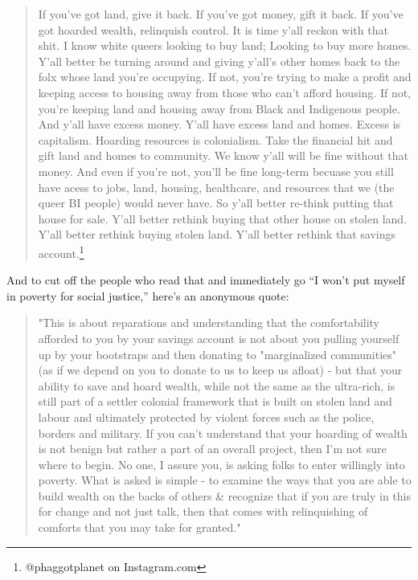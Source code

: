 \documentclass[11pt]{article}
\begin{document}
\begin{itemize}
\begin{quote}
If you've got land, give it back. If you've got money, gift it back. If you've got hoarded wealth, relinquish control. It is time y'all reckon with that shit. I know white queers looking to buy land; Looking to buy more homes. Y'all better be turning around and giving y'all's other homes back to the folx whose land you're occupying. If not, you're trying to make a profit and keeping access to housing away from those who can't afford housing. If not, you're keeping land and housing away from Black and Indigenous people. And y'all have excess money. Y'all have excess land and homes. Excess is capitalism. Hoarding resources is colonialism. Take the financial hit and gift land and homes to community. We know y'all will be fine without that money. And even if you're not, you'll be fine long-term becuase you still have acess to jobs, land, housing, healthcare, and resources that we (the queer BI people) would never have. So y'all better re-think putting that house for sale. Y'all better rethink buying that other house on stolen land. Y'all better rethink buying stolen land. Y'all better rethink that savings account.\footnote{@phaggotplanet on Instagram.com}
\end{quote}

And to cut off the people who read that and immediately go “I won’t put myself in poverty for social justice,” here’s an anonymous quote:

\begin{quote}
"This is about reparations and understanding that the comfortability afforded to you by your savings account is not about you pulling yourself up by your bootstraps and then donating to "marginalized communities" (as if we depend on you to donate to us to keep us afloat) - but that your ability to save and hoard wealth, while not the same as the ultra-rich, is still part of a settler colonial framework that is built on stolen land and labour and ultimately protected by violent forces such as the police, borders and military. If you can't understand that your hoarding of wealth is not benign but rather a part of an overall project, then I'm not sure where to begin. No one, I assure you, is asking folks to enter willingly into poverty. What is asked is simple - to examine the ways that you are able to build wealth on the backs of others \& recognize that if you are truly in this for change and not just talk, then that comes with relinquishing of comforts that you may take for granted."
\end{quote}


\end{itemize}
\end{document}
